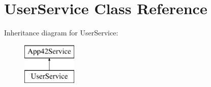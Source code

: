 \hypertarget{class_user_service}{\section{User\+Service Class Reference}
\label{class_user_service}
}
Inheritance diagram for User\+Service\+:\begin{figure}[H]
\begin{center}
\leavevmode
\includegraphics[height=2.000000cm]{class_user_service}
\end{center}
\end{figure}
